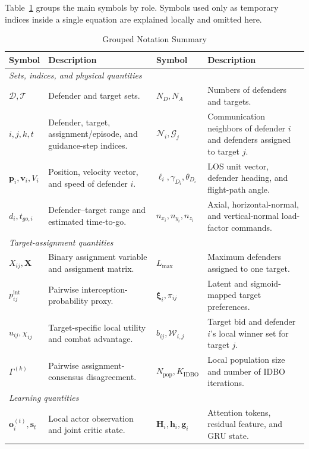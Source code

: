 \documentclass[lettersize,journal]{IEEEtran}
\begin{document}
Table~\ref{tab:notation} groups the main symbols by role. Symbols used only as temporary
indices inside a single equation are explained locally and omitted here.

\begin{table}[!t]
\centering
\caption{Grouped Notation Summary}
\label{tab:notation}
\renewcommand{\arraystretch}{1.12}
\footnotesize
\begin{tabular}{@{}p{}p{}p{}p{}@{}}
\toprule
Symbol & Description & Symbol & Description \\
\midrule
\multicolumn{4}{l}{\emph{Sets, indices, and physical quantities}}\\
$\mathcal D,\mathcal T$ & Defender and target sets. &
$N_D,N_A$ & Numbers of defenders and targets.\\
$i,j,k,t$ & Defender, target, assignment/episode, and guidance-step indices. &
$\mathcal N_i,\mathcal G_j$ & Communication neighbors of defender $i$ and defenders assigned to target $j$.\\
$\mathbf p_i,\mathbf v_i,V_i$ & Position, velocity vector, and speed of defender $i$. &
$\boldsymbol\ell_i,\gamma_{D_i},\theta_{D_i}$ & LOS unit vector, defender heading, and flight-path angle.\\
$d_i,t_{go,i}$ & Defender--target range and estimated time-to-go. &
$n_{x_i},n_{y_i},n_{z_i}$ & Axial, horizontal-normal, and vertical-normal load-factor commands.\\
\midrule
\multicolumn{4}{l}{\emph{Target-assignment quantities}}\\
$X_{ij},\mathbf X$ & Binary assignment variable and assignment matrix. &
$L_{\max}$ & Maximum defenders assigned to one target.\\
$p_{ij}^{\mathrm{int}}$ & Pairwise interception-probability proxy. &
$\boldsymbol\xi_i,\pi_{ij}$ & Latent and sigmoid-mapped target preferences.\\
$u_{ij},\chi_{ij}$ & Target-specific local utility and combat advantage. &
$b_{ij},\mathcal W_{i,j}$ & Target bid and defender $i$'s local winner set for target $j$.\\
$\Gamma^{(k)}$ & Pairwise assignment-consensus disagreement. &
$N_{\mathrm{pop}},K_{\mathrm{IDBO}}$ & Local population size and number of IDBO iterations.\\
\midrule
\multicolumn{4}{l}{\emph{Learning quantities}}\\
$\mathbf o_i^{(t)},\mathbf s_t$ & Local actor observation and joint critic state. &
$\mathbf H_i,\mathbf h_i,\mathbf g_i$ & Attention tokens, residual feature, and GRU state.\\

\end{tabular}
\end{table}
\end{document}
